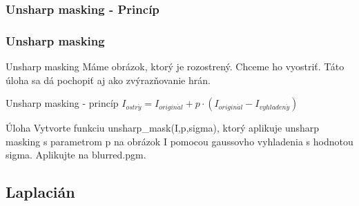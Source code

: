 \documentclass{beamer}
\begin{document}
\begin{frame}
\frametitle{Unsharp masking - Princíp} 
\noindent{}
\end{frame}

\begin{frame}
\frametitle{Unsharp masking} 
  \begin{block}{Unsharp masking}
    Máme obrázok, ktorý je rozostrený. Chceme ho vyostriť. Táto úloha sa dá pochopiť aj ako zvýrazňovanie hrán.
  \end{block} 
 
  \begin{block}{Unsharp masking - princíp}
    $I_{ostr\acute{y}} = I_{origin\acute{a}l} + p \cdot \left( I_{origin\acute{a}l} - I_{vyhladen\acute{y}} \right)$
  \end{block}
  
  \begin{block}{Úloha}
  Vytvorte funkciu unsharp\_mask(I,p,sigma), ktorý aplikuje unsharp masking s parametrom p na obrázok I pomocou gaussovho vyhladenia s hodnotou sigma. Aplikujte na blurred.pgm.
  \end{block}
\end{frame}


\subsection{Laplacián}
\end{document}
